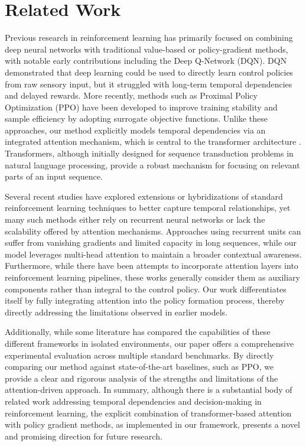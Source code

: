 \documentclass{article}
\begin{document}
\section{Related Work}
Previous research in reinforcement learning has primarily focused on combining deep neural networks with traditional value-based or policy-gradient methods, with notable early contributions including the Deep Q-Network (DQN). DQN demonstrated that deep learning could be used to directly learn control policies from raw sensory input, but it struggled with long-term temporal dependencies and delayed rewards. More recently, methods such as Proximal Policy Optimization (PPO) have been developed to improve training stability and sample efficiency by adopting surrogate objective functions. Unlike these approaches, our method explicitly models temporal dependencies via an integrated attention mechanism, which is central to the transformer architecture \cite{ashish_2017_attention}. Transformers, although initially designed for sequence transduction problems in natural language processing, provide a robust mechanism for focusing on relevant parts of an input sequence.

Several recent studies have explored extensions or hybridizations of standard reinforcement learning techniques to better capture temporal relationships, yet many such methods either rely on recurrent neural networks or lack the scalability offered by attention mechanisms. Approaches using recurrent units can suffer from vanishing gradients and limited capacity in long sequences, while our model leverages multi-head attention to maintain a broader contextual awareness. Furthermore, while there have been attempts to incorporate attention layers into reinforcement learning pipelines, these works generally consider them as auxiliary components rather than integral to the control policy. Our work differentiates itself by fully integrating attention into the policy formation process, thereby directly addressing the limitations observed in earlier models.

Additionally, while some literature has compared the capabilities of these different frameworks in isolated environments, our paper offers a comprehensive experimental evaluation across multiple standard benchmarks. By directly comparing our method against state-of-the-art baselines, such as PPO, we provide a clear and rigorous analysis of the strengths and limitations of the attention-driven approach. In summary, although there is a substantial body of related work addressing temporal dependencies and decision-making in reinforcement learning, the explicit combination of transformer-based attention with policy gradient methods, as implemented in our framework, presents a novel and promising direction for future research.
\end{document}
